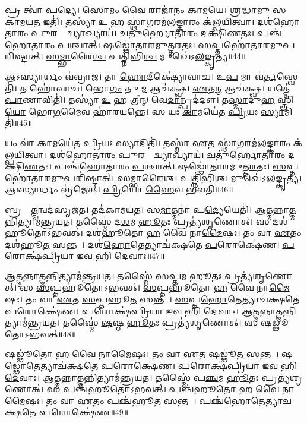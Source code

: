 𑌪𑍍𑌰 𑌤𑍍𑌵𑌾॑ 𑌪𑌦𑍍𑌯𑍇।
𑌸𑍋\ul{𑌮𑌂} 𑌵𑍈 𑌰𑌾𑌜𑌾॑𑌨𑌂 𑌕𑌾𑌮𑌯𑍇।
\ul{𑌶𑍍𑌰}𑌦𑍍𑌧𑌾\ul{𑌮𑍁} 𑌸 𑌕𑌾॑𑌮𑌯\ul{𑌤} 𑌇𑌤𑌿॑।
𑌤𑌸𑍍𑌯𑌾॑ \ul{𑌉} 𑌹 𑌸𑍍𑌥𑌾॑\ul{𑌗}𑌰𑌮॑𑌲\ul{𑌙𑍍𑌕𑌾}𑌰𑌂 𑌕॑𑌲𑍍𑌪\ul{𑌯𑌿}𑌤𑍍𑌵𑌾।
𑌦𑌶॑𑌹𑍋𑌤𑌾𑌰𑌂 \ul{𑌪𑍁}𑌰𑌸𑍍𑌤𑌾᳚\ul{𑌦𑍍𑌵𑍍𑌯𑌾}𑌖𑍍𑌯𑌾𑌯॑।
𑌚𑌤𑍁॑𑌰𑍍\mbox{}𑌹𑍋𑌤𑌾𑌰𑌂 𑌦𑌕𑍍𑌷𑌿\ul{𑌣}𑌤𑌃।
𑌪𑌞𑍍𑌚॑𑌹𑍋𑌤𑌾𑌰𑌂 \ul{𑌪}𑌶𑍍𑌚𑌾𑌤𑍍।
𑌷𑌡𑍍𑌢𑍋॑𑌤𑌾𑌰𑌮𑍁𑌤𑍍𑌤\ul{𑌰}𑌤𑌃।
\ul{𑌸}𑌪𑍍𑌤𑌹𑍋॑𑌤𑌾𑌰\ul{𑌮𑍁}𑌪𑌰𑌿॑𑌷𑍍𑌟𑌾𑌤𑍍।
\ul{𑌸}\ul{𑌮𑍍𑌭𑌾}𑌰𑍈\ul{𑌶𑍍𑌚} 𑌪𑌤𑍍𑌨𑌿॑𑌭𑌿\ul{𑌶𑍍𑌚} 𑌮𑍁𑌖𑍇॑\-𑌽\ul{𑌲}𑌙𑍍𑌕𑍃𑌤𑍍𑌯॑॥44॥

𑌆𑌽𑌸𑍍𑌯𑌾𑌰𑍍𑌧𑌂 𑌵॑𑌵𑍍𑌰𑌾𑌜।
𑌤𑌾 \ul{𑌹𑍋}𑌦𑍀𑌕𑍍𑌷𑍍𑌯𑍋॑𑌵𑌾𑌚।
𑌉\ul{𑌪} 𑌮𑌾 𑌵॑\ul{𑌰𑍍𑌤}𑌸𑍍𑌵𑍇𑌤𑌿॑।
𑌤 𑌹𑍋॑𑌵𑌾𑌚।
𑌭𑍋\ul{𑌗𑌂} 𑌤𑍁 \ul{𑌮} 𑌆𑌚॑𑌕𑍍𑌷𑍍𑌵।
\ul{𑌏}𑌤\ul{𑌨𑍍𑌮} 𑌆𑌚॑𑌕𑍍𑌷𑍍𑌵।
𑌯𑌤𑍍𑌤𑍇॑ \ul{𑌪𑌾}𑌣𑌾𑌵𑌿𑌤𑌿॑।
𑌤𑌸𑍍𑌯𑌾॑ \ul{𑌉} 𑌹 𑌤𑍍𑌰𑍀𑌨𑍍 𑌵𑍇\ul{𑌦𑌾}𑌨𑍍𑌪𑍍𑌰𑌦॑𑌦𑍗।
𑌤\ul{𑌸𑍍𑌮𑌾}𑌦𑍁\ul{𑌹} 𑌸𑍍𑌤𑍍𑌰𑌿\ul{𑌯𑍋} 𑌭𑍋\ul{𑌗}𑌮𑍈𑌵 𑌹𑌾॑𑌰𑌯𑌨𑍍𑌤𑍇।
𑌸 𑌯𑌃 \ul{𑌕𑌾}𑌮𑌯𑍇॑𑌤 \ul{𑌪𑍍𑌰𑌿}𑌯𑌃 \ul{𑌸𑍍𑌯𑌾}𑌮𑌿𑌤𑌿॑॥45॥

𑌯𑌂 𑌵𑌾॑ \ul{𑌕𑌾}𑌮𑌯𑍇॑𑌤 \ul{𑌪𑍍𑌰𑌿}𑌯𑌃 \ul{𑌸𑍍𑌯𑌾}𑌦𑌿𑌤𑌿॑।
𑌤𑌸𑍍𑌮𑌾॑ \ul{𑌏}𑌤 𑌸𑍍𑌥𑌾॑\ul{𑌗}𑌰𑌮॑𑌲\ul{𑌙𑍍𑌕𑌾}𑌰𑌂 𑌕॑𑌲𑍍𑌪\ul{𑌯𑌿}𑌤𑍍𑌵𑌾।
𑌦𑌶॑𑌹𑍋𑌤𑌾𑌰𑌂 \ul{𑌪𑍁}𑌰𑌸𑍍𑌤𑌾᳚\ul{𑌦𑍍𑌵𑍍𑌯𑌾}𑌖𑍍𑌯𑌾𑌯॑।
𑌚𑌤𑍁॑𑌰𑍍\mbox{}𑌹𑍋𑌤𑌾𑌰𑌂 𑌦𑌕𑍍𑌷𑌿\ul{𑌣}𑌤𑌃।
𑌪𑌞𑍍𑌚॑𑌹𑍋𑌤𑌾𑌰𑌂 \ul{𑌪}𑌶𑍍𑌚𑌾𑌤𑍍।
𑌷𑌡𑍍𑌢𑍋॑𑌤𑌾𑌰𑌮𑍁𑌤𑍍𑌤\ul{𑌰}𑌤𑌃।
\ul{𑌸}𑌪𑍍𑌤𑌹𑍋॑𑌤𑌾𑌰\ul{𑌮𑍁}𑌪𑌰𑌿॑𑌷𑍍𑌟𑌾𑌤𑍍।
\ul{𑌸}\ul{𑌮𑍍𑌭𑌾}𑌰𑍈\ul{𑌶𑍍𑌚} 𑌪𑌤𑍍𑌨𑌿॑𑌭𑌿\ul{𑌶𑍍𑌚} 𑌮𑍁𑌖𑍇॑\-𑌽\ul{𑌲}𑌙𑍍𑌕𑍃𑌤𑍍𑌯॑।
𑌆𑌸𑍍𑌯𑌾𑌰𑍍𑌧𑌂 𑌵𑍍𑌰॑𑌜𑍇𑌤𑍍।
\ul{𑌪𑍍𑌰𑌿}𑌯𑍋 \ul{𑌹𑍈}𑌵 𑌭॑𑌵𑌤𑌿॥46॥\anuvakamend[\ul{𑌅}\ul{𑌯𑌾}\ul{𑌨𑍍𑌯}\ul{𑌲}𑌙𑍍𑌕𑍃𑌤𑍍𑌯॑ \ul{𑌸𑍍𑌯𑌾}𑌮𑌿𑌤𑌿॑ 𑌭𑌵𑌤𑌿]

𑌬𑍍𑌰𑌹𑍍𑌮𑌾᳚\ul{𑌤𑍍𑌮}𑌨𑍍𑌵𑌦॑𑌸𑍃𑌜𑌤।
𑌤𑌦॑𑌕𑌾𑌮𑌯𑌤।
𑌸\ul{𑌮𑌾}𑌤𑍍𑌮𑌨𑌾॑ 𑌪\ul{𑌦𑍍𑌯𑍇}𑌯𑍇𑌤𑌿॑।
𑌆\ul{𑌤𑍍𑌮}𑌨𑍍𑌨𑌾\ul{𑌤𑍍𑌮}𑌨𑍍𑌨𑌿𑌤𑍍𑌯𑌾𑌮॑𑌨𑍍𑌤𑍍𑌰𑌯𑌤।
𑌤𑌸𑍍𑌮𑍈॑ 𑌦\ul{𑌶}𑌮 \ul{𑌹𑍂}𑌤𑌃 𑌪𑍍𑌰𑌤𑍍𑌯॑𑌶𑍃𑌣𑍋𑌤𑍍।
𑌸 𑌦𑌶॑𑌹𑍂𑌤𑍋\-𑌽𑌭𑌵𑌤𑍍।
𑌦𑌶॑𑌹𑍂𑌤𑍋 \ul{𑌹} 𑌵𑍈 𑌨𑌾\ul{𑌮𑍈}𑌷𑌃।
𑌤𑌂 𑌵𑌾 \ul{𑌏}𑌤𑌂 𑌦𑌶॑𑌹𑍂\ul{𑌤}\ul{} 𑌸𑌨𑍍𑌤𑌮𑍍᳚।
𑌦𑌶॑\ul{𑌹𑍋}𑌤𑍇𑌤𑍍𑌯𑌾𑌚॑𑌕𑍍𑌷𑌤𑍇 \ul{𑌪}𑌰𑍋𑌕𑍍𑌷𑍇॑𑌣।
\ul{𑌪}𑌰𑍋𑌕𑍍𑌷॑𑌪𑍍𑌰𑌿𑌯𑌾 𑌇\ul{𑌵} 𑌹𑌿 \ul{𑌦𑍇}𑌵𑌾𑌃॥47॥

𑌆\ul{𑌤𑍍𑌮}𑌨𑍍𑌨𑌾\ul{𑌤𑍍𑌮}𑌨𑍍𑌨𑌿𑌤𑍍𑌯𑌾𑌮॑𑌨𑍍𑌤𑍍𑌰𑌯𑌤।
𑌤𑌸𑍍𑌮𑍈॑ 𑌸\ul{𑌪𑍍𑌤}𑌮 \ul{𑌹𑍂}𑌤𑌃 𑌪𑍍𑌰𑌤𑍍𑌯॑𑌶𑍃𑌣𑍋𑌤𑍍।
𑌸 \ul{𑌸}𑌪𑍍𑌤𑌹𑍂॑𑌤𑍋\-𑌽𑌭𑌵𑌤𑍍।
\ul{𑌸}𑌪𑍍𑌤𑌹𑍂॑𑌤𑍋 \ul{𑌹} 𑌵𑍈 𑌨𑌾\ul{𑌮𑍈}𑌷𑌃।
𑌤𑌂 𑌵𑌾 \ul{𑌏}𑌤 \ul{𑌸}𑌪𑍍𑌤𑌹𑍂॑\ul{𑌤}\ul{} 𑌸𑌨𑍍𑌤𑌮𑍍᳚।
\ul{𑌸}𑌪𑍍𑌤\ul{𑌹𑍋}𑌤𑍇𑌤𑍍𑌯𑌾𑌚॑𑌕𑍍𑌷𑌤𑍇 \ul{𑌪}𑌰𑍋𑌕𑍍𑌷𑍇॑𑌣।
\ul{𑌪}𑌰𑍋𑌕𑍍𑌷॑𑌪𑍍𑌰𑌿𑌯𑌾 𑌇\ul{𑌵} 𑌹𑌿 \ul{𑌦𑍇}𑌵𑌾𑌃।
𑌆\ul{𑌤𑍍𑌮}𑌨𑍍𑌨𑌾\ul{𑌤𑍍𑌮}𑌨𑍍𑌨𑌿𑌤𑍍𑌯𑌾𑌮॑𑌨𑍍𑌤𑍍𑌰𑌯𑌤।
𑌤𑌸𑍍𑌮𑍈॑ \ul{𑌷}𑌷𑍍𑌠 \ul{𑌹𑍂}𑌤𑌃 𑌪𑍍𑌰𑌤𑍍𑌯॑𑌶𑍃𑌣𑍋𑌤𑍍।
𑌸 𑌷𑌡𑍍𑌢𑍂॑𑌤𑍋\-𑌽𑌭𑌵𑌤𑍍॥48॥

𑌷𑌡𑍍𑌢𑍂॑𑌤𑍋 \ul{𑌹} 𑌵𑍈 𑌨𑌾\ul{𑌮𑍈}𑌷𑌃।
𑌤𑌂 𑌵𑌾 \ul{𑌏}𑌤 𑌷𑌡𑍍𑌢𑍂॑\ul{𑌤}\ul{} 𑌸𑌨𑍍𑌤𑌮𑍍᳚।
𑌷\ul{𑌡𑍍𑌢𑍋}𑌤𑍇𑌤𑍍𑌯𑌾𑌚॑𑌕𑍍𑌷𑌤𑍇 \ul{𑌪}𑌰𑍋𑌕𑍍𑌷𑍇॑𑌣।
\ul{𑌪}𑌰𑍋𑌕𑍍𑌷॑𑌪𑍍𑌰𑌿𑌯𑌾 𑌇\ul{𑌵} 𑌹𑌿 \ul{𑌦𑍇}𑌵𑌾𑌃।
𑌆\ul{𑌤𑍍𑌮}𑌨𑍍𑌨𑌾\ul{𑌤𑍍𑌮}𑌨𑍍𑌨𑌿𑌤𑍍𑌯𑌾𑌮॑𑌨𑍍𑌤𑍍𑌰𑌯𑌤।
𑌤𑌸𑍍𑌮𑍈॑ 𑌪\ul{𑌞𑍍𑌚}𑌮 \ul{𑌹𑍂}𑌤𑌃 𑌪𑍍𑌰𑌤𑍍𑌯॑𑌶𑍃𑌣𑍋𑌤𑍍।
𑌸 𑌪𑌞𑍍𑌚॑𑌹𑍂𑌤𑍋\-𑌽𑌭𑌵𑌤𑍍।
𑌪𑌞𑍍𑌚॑𑌹𑍂𑌤𑍋 \ul{𑌹} 𑌵𑍈 𑌨𑌾\ul{𑌮𑍈}𑌷𑌃।
𑌤𑌂 𑌵𑌾 \ul{𑌏}𑌤𑌂 𑌪𑌞𑍍𑌚॑𑌹𑍂\ul{𑌤}\ul{} 𑌸𑌨𑍍𑌤𑌮𑍍᳚।
𑌪𑌞𑍍𑌚॑\ul{𑌹𑍋}𑌤𑍇𑌤𑍍𑌯𑌾𑌚॑𑌕𑍍𑌷𑌤𑍇 \ul{𑌪}𑌰𑍋𑌕𑍍𑌷𑍇॑𑌣॥49॥


